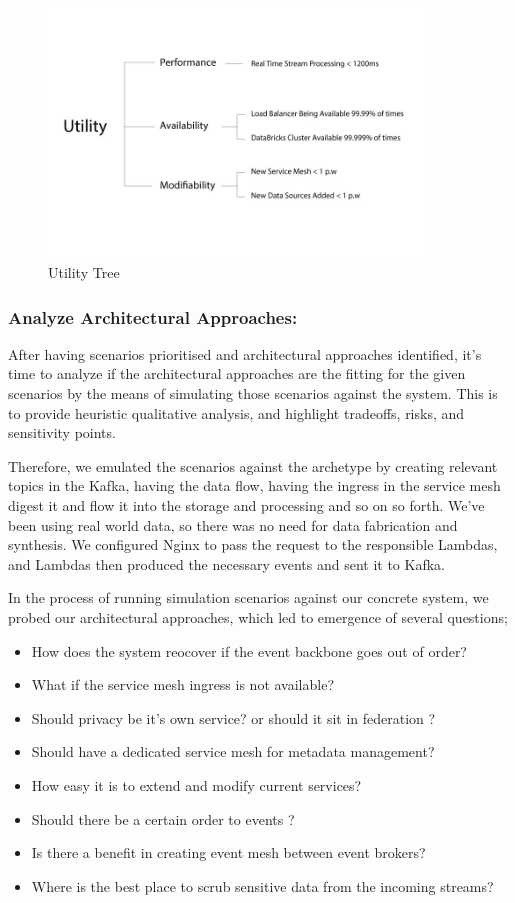 \documentclass[review]{elsarticle}
\begin{document}
\begin{figure}[h!]
    \centering
    \includegraphics[width=10cm]{Media/Utility-tree.jpg}
    \caption{Utility Tree}
    \label{fig:utility-tree}
\end{figure}



\subsubsection{Analyze Architectural Approaches:}

After having scenarios prioritised and architectural approaches identified, it's time to analyze if the architectural approaches are the fitting for the given scenarios by the means of simulating those scenarios against the system. This is to provide heuristic qualitative analysis, and highlight tradeoffs, risks, and sensitivity points.

Therefore, we emulated the scenarios against the archetype by creating relevant topics in the Kafka, having the data flow, having the ingress in the service mesh digest it and flow it into the storage and processing and so on so forth. We've been using real world data, so there was no need for data fabrication and synthesis.  We configured Nginx to pass the request to the responsible Lambdas, and Lambdas then produced the necessary events and sent it to Kafka.

In the process of running simulation scenarios against our concrete system, we probed our architectural approaches, which led to emergence of several questions;

\begin{itemize}
    \item How does the system reocover if the event backbone goes out of order?
    \item What if the service mesh ingress is not available?
    \item Should privacy be it's own service? or should it sit in federation ?
    \item Should have a dedicated service mesh for metadata management?
    \item How easy it is to extend and modify current services?
    \item Should there be a certain order to events ?
    \item Is there a benefit in creating event mesh between event brokers?
    \item Where is the best place to scrub sensitive data from the incoming streams?
\end{itemize}
\end{document}
